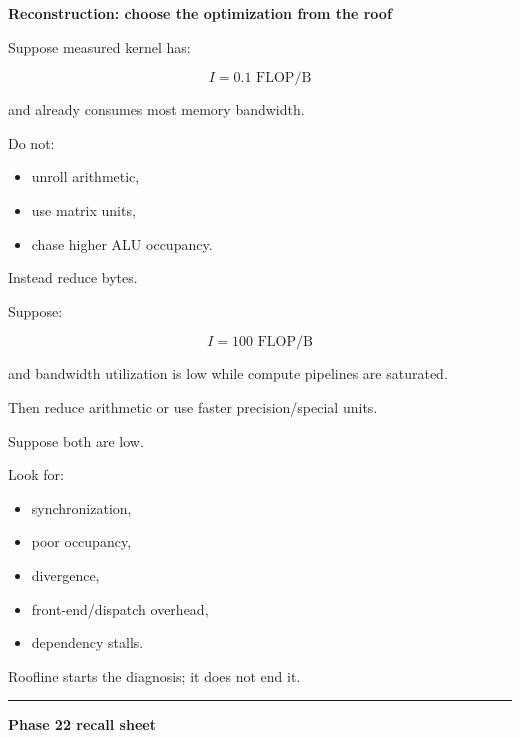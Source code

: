 \textbf{Reconstruction: choose the optimization from the roof}

Suppose measured kernel has:

\[
I=0.1\text{ FLOP/B}
\]

and already consumes most memory bandwidth.

Do not:

\begin{itemize}
\tightlist
\item
  unroll arithmetic,
\item
  use matrix units,
\item
  chase higher ALU occupancy.
\end{itemize}

Instead reduce bytes.

Suppose:

\[
I=100\text{ FLOP/B}
\]

and bandwidth utilization is low while compute pipelines are saturated.

Then reduce arithmetic or use faster precision/special units.

Suppose both are low.

Look for:

\begin{itemize}
\tightlist
\item
  synchronization,
\item
  poor occupancy,
\item
  divergence,
\item
  front-end/dispatch overhead,
\item
  dependency stalls.
\end{itemize}

Roofline starts the diagnosis; it does not end it.

\begin{center}\rule{0.5\linewidth}{0.5pt}\end{center}

\textbf{Phase 22 recall sheet}

